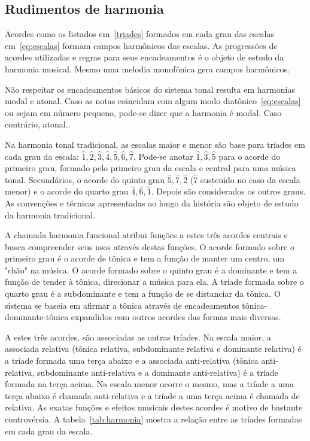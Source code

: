 \subsection{Rudimentos de harmonia}\label{subsec:harmonia}

Acordes como os listados em~\ref{triades} formados em cada
grau das escalas em~\ref{eq:escalas} formam campos harmônicos
das escalas. As progressões de acordes utilizadas e regras para seus encadeamentos é o objeto de estudo da harmonia musical.
Mesmo uma melodia monofônica gera campos harmônicos.

Não respeitar 
os encadeamentos básicos do sistema tonal resulta
em harmonias modal e atonal. Caso
as notas coincidam com algum modo diatônico~\ref{eq:escalas}
ou sejam em número pequeno, pode-se dizer que a
harmonia é modal. Caso contrário, atonal.\cite{harmEXT}.

Na harmonia tonal tradicional,
as escalas maior e menor são
base para tríades em cada grau 
da escala: $\hat{1},\hat{2},\hat{3},\hat{4},\hat{5},\hat{6},\hat{7}$.
Pode-se anotar $\hat{1},\hat{3},\hat{5}$ para o acorde do primeiro grau, formado pelo primeiro grau da escala e central para uma música tonal. Secundários, o acorde do quinto grau $\hat{5},\hat{7},\hat{2}$ ($\hat{7}$ sustenido no caso da escala menor) e o acorde do quarto grau $\hat{4},\hat{6},\hat{1}$. Depois são considerados os outros graus. As convenções e técnicas apresentadas ao longo da história 
são objeto de estudo da harmonia tradicional.\cite{Harmonia}

A chamada harmonia funcional atribui funções a estes três acordes centrais e busca compreender seus usos através destas funções. O acorde formado sobre o primeiro grau é o acorde de tônica e tem a função de manter um centro, um "chão" na música. O acorde formado sobre o quinto grau é a dominante e tem a função de tender à tônica, direcionar a música para ela. A tríade formada sobre o quarto grau é a subdominante e tem a função de se distanciar da tônica. O sistema se baseia em afirmar a tônica através de encadeamentos tônica-dominante-tônica expandidos com outros acordes das formas mais diversas.


A estes três acordes, são associadas as outras tríades. Na escala maior, a associada relativa (tônica relativa, subdominante relativa e dominante relativa) é a tríade formada uma terça abaixo e a associada anti-relativa (tônica anti-relativa, subdominante anti-relativa e a dominante anti-relativa) é a tríade formada na terça acima. Na escala menor ocorre o mesmo, mas a tríade a uma terça abaixo é chamada anti-relativa e a tríade a uma terça acima é chamada de relativa. As exatas funções e efeitos musicais destes acordes é motivo de bastante controvérsia. A tabela~\ref{tab:harmonia} mostra a relação entre as tríades formadas em cada grau da escala.

